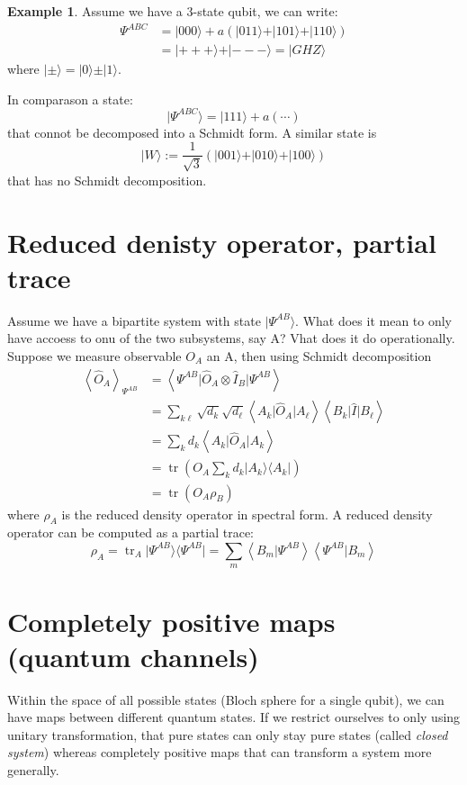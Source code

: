 \documentclass[12pt]{book}
\theoremstyle{definition}
\newtheorem*{example}{\bfseries Example}
\newcommand{\scalar}[1]{\left\langle {#1}\right\rangle}
\let\oldsum\sum
\renewcommand{\sum}[2]{\oldsum\limits_{#1}^{#2}}
\newcommand{\para}[1]{\left( {#1} \right)}
\newcommand{\bra}[1]{\langle {#1} \vert}
\newcommand{\ket}[1]{\vert {#1} \rangle}
\DeclareMathOperator{\tr}{tr}
\begin{document}
\begin{example}
Assume we have a 3-state qubit, we can write:
\begin{align*}
  \Psi^{ABC} & = \ket{000} + a \para{\ket{011} + \ket{101} + \ket{110}} \\
  & = \ket{+++} + \ket{---} = \ket{GHZ}
\end{align*}
where $\ket{\pm} = \ket{0} \pm \ket{1}$.

In comparason a state:
\begin{equation*}
  \ket{\Psi^{ABC}} = \ket{111} + a \para{\cdots}
\end{equation*}
that connot be decomposed into a Schmidt form. A similar state is
\begin{equation*}
  \ket{W} := \frac{1}{\sqrt{3}} \para{\ket{001} + \ket{010} + \ket{100}}
\end{equation*}
that has no Schmidt decomposition.
\end{example}

\section{Reduced denisty operator, partial trace}

Assume we have a bipartite system with state $\ket{\Psi^{AB}}$. What does it mean to only have accoess to onu of the two subsystems, say A? Vhat does it do operationally. Suppose we measure observable $O_A$ an A, then using Schmidt decomposition
\begin{align*}
  \scalar{\hat O_A}_{\Psi^{AB}} & = \scalar{\Psi^{AB} \vert \hat O_A \otimes \hat I_B \vert \Psi^{AB}} \\
  & = \oldsum_{k\ell} \sqrt{d_k} \sqrt{d_\ell} \scalar{A_k \vert \hat O_A \vert A_\ell} \scalar{B_k \vert \hat I \vert B_\ell} \\
  & = \oldsum_{k} d_k \scalar{A_k \vert \hat O_A \vert A_k} \\
  & = \tr\para{O_A \oldsum_k d_k \ket{A_k} \bra{A_k}} \\
  & = \tr\para{O_A \rho_B}
\end{align*}
where $\rho_A$ is the reduced density operator in spectral form. A reduced density operator can be computed as a partial trace:
\begin{equation}
  \rho_A = \tr_A \ket{\Psi^{AB}} \bra{\Psi^{AB}} = \oldsum_m \scalar{B_m \vert \Psi^{AB}} \scalar{\Psi^{AB} \vert B_m}
\end{equation}


\section{Completely positive maps (quantum channels)}
Within the space of all possible states (Bloch sphere for a single qubit), we can have maps between different quantum states. If we restrict ourselves to only using unitary transformation, that pure states can only stay pure states (called \emph{closed system}) whereas completely positive maps that can transform a system more generally.
\end{document}
